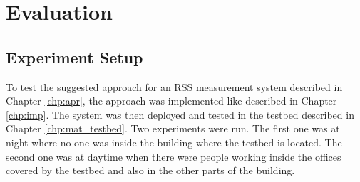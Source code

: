 \chapter{Evaluation}






\section{Experiment Setup}
To test the suggested approach for an RSS measurement system described in Chapter \ref{chp:apr}, the approach was implemented like described in Chapter \ref{chp:imp}. The system was then deployed and tested in the testbed described in Chapter \ref{chp:mat_testbed}. Two experiments were run. The first one was at night where no one was inside the building where the testbed is located. The second one was at daytime when there were people working inside the offices covered by the testbed and also in the other parts of the building. 

